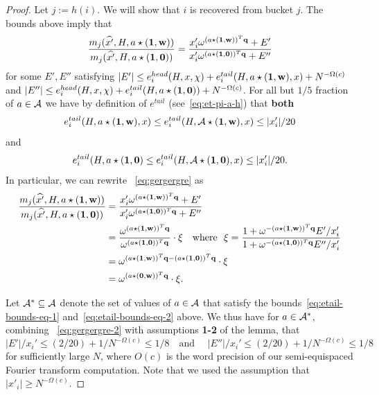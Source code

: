 \begin{proof}
Let $j:=h(i)$. We will show that $i$ is recovered from bucket $j$. The bounds above imply that 
\begin{equation}\label{eq:gergergre}
\begin{split}
\frac{m_j(\widehat{x'}, H, a\star (\mathbf{1}, \mathbf{w}))}{m_j(\widehat{x'}, H, a\star (\mathbf{1}, \mathbf{0}))}=\frac{x'_i \omega^{(a\star (\mathbf{1}, \mathbf{w}))^T {\bf q}}+E'}{x'_i \omega^{(a\star (\mathbf{1}, \mathbf{0}))^T {\bf q}}+E''}
\end{split}
\end{equation}
for some $E', E''$ satisfying $|E'|\leq e^{head}_i(H, x, \chi)+e^{tail}_i(H, a\star (\mathbf{1}, \mathbf{w}), x)+N^{-\Omega(c)}$ and $|E''|\leq e^{head}_i(H, x, \chi)+e^{tail}_i(H, a\star (\mathbf{1}, \mathbf{0}))+N^{-\Omega(c)}$. For all but $1/5$ fraction of $a\in {\mathcal{A}}$ we have by definition of $e^{tail}$ (see~\eqref{eq:et-pi-a-h}) that {\bf both} 
\begin{equation}\label{eq:etail-bounds-eq-1}
e^{tail}_i(H, a\star (\mathbf{1}, \mathbf{w}), x)\leq e^{tail}_i(H, {\mathcal{A}}\star (\mathbf{1}, \mathbf{w}), x)\leq |x'_i|/20
\end{equation}
 and 
\begin{equation}\label{eq:etail-bounds-eq-2}
 e^{tail}_i(H, a\star (\mathbf{1}, \mathbf{0})\leq e^{tail}_i(H, {\mathcal{A}}\star (\mathbf{1}, \mathbf{0}), x)\leq |x'_i|/20.
\end{equation}
In particular, we can rewrite ~\eqref{eq:gergergre} as
\begin{equation}\label{eq:gergergre-2}
\begin{split}
\frac{m_j(\widehat{x'}, H, a\star (\mathbf{1}, \mathbf{w}))}{m_j(\widehat{x'}, H, a\star (\mathbf{1}, \mathbf{0}))}&=\frac{x'_i \omega^{(a\star (\mathbf{1}, \mathbf{w}))^T {\bf q}}+E'}{x'_i \omega^{(a\star (\mathbf{1}, \mathbf{0}))^T {\bf q}}+E''}\\
&=\frac{\omega^{(a\star (\mathbf{1}, \mathbf{w}))^T {\bf q}}}{\omega^{(a\star (\mathbf{1}, \mathbf{0}))^T {\bf q}}}\cdot\xi\text{~~~where~~}\xi=\frac{1+\omega^{-(a\star (\mathbf{1}, \mathbf{w}))^T {\bf q}}E'/x_i'}{1+\omega^{-(a\star (\mathbf{1}, \mathbf{0}))^T{\bf q}} E''/x_i'}\\
&=\omega^{(a\star (\mathbf{1}, \mathbf{w}))^T {\bf q}-(a\star (\mathbf{1}, \mathbf{0}))^T {\bf q}}\cdot\xi\\
&=\omega^{(a\star (\mathbf{0}, \mathbf{w}))^T {\bf q}}\cdot\xi.\\
\end{split}
\end{equation}

Let ${\mathcal{A}}^*\subseteq {\mathcal{A}}$ denote the set of values of $a\in {\mathcal{A}}$ that satisfy the bounds~\eqref{eq:etail-bounds-eq-1} and~\eqref{eq:etail-bounds-eq-2} above.
We thus have for  $a\in {\mathcal{A}}^*$, combining ~\eqref{eq:gergergre-2} with assumptions {\bf 1-2} of the lemma, that
\begin{equation}\label{eq:bound-1-oigb344tg32t}
|E'|/x_i'\leq  (2/20)+1/N^{-\Omega(c)}\leq 1/8\text{~~~and~~~~}|E''|/x_i'\leq  (2/20)+1/N^{-\Omega(c)}\leq 1/8
\end{equation}
for sufficiently large $N$, where $O(c)$ is the word precision of our semi-equispaced Fourier transform computation. Note that we used the assumption that $|x'_i|\geq N^{-\Omega(c)}$.


\end{proof}
